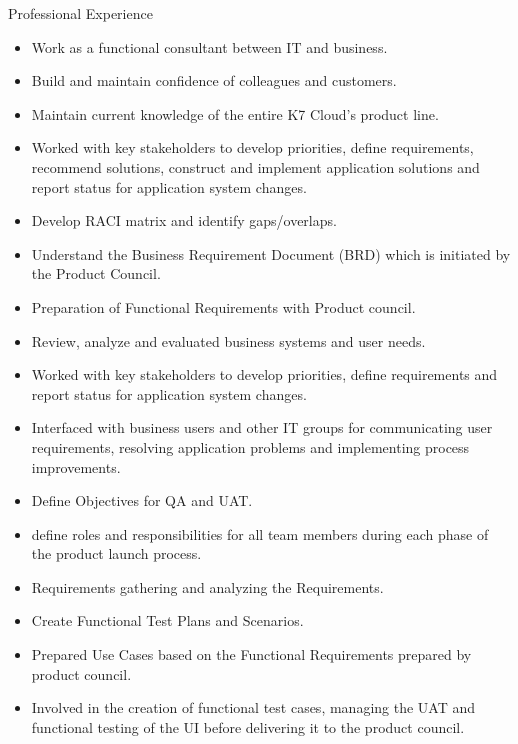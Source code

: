 \documentclass[a4paper,12pt]{article}
\begin{document}

\begin{resumeblock}{Professional Experience}

  \begin{itemize} %
    \item Work as a functional consultant between IT and business.
    \item Build and maintain confidence of colleagues and customers.
    \item Maintain current knowledge of the entire K7 Cloud’s product line.
    \item Worked with key stakeholders to develop priorities, define requirements, recommend solutions, construct and implement application solutions and report status for application system changes.
    \item Develop RACI matrix and identify gaps/overlaps.
    \item Understand the Business Requirement Document (BRD) which is initiated by the Product Council.
    \item Preparation of Functional Requirements with Product council. 
    \item Review, analyze and evaluated business systems and user needs.
    \item Worked with key stakeholders to develop priorities, define requirements and report status for application system changes.
    \item Interfaced with business users and other IT groups  for communicating user requirements, resolving application problems and implementing process improvements.
    \item Define Objectives for QA and UAT. 
    \item define roles and responsibilities for all team members during each phase of the product launch process.

    \item Requirements gathering and analyzing the Requirements.
    \item Create Functional Test Plans and Scenarios.
    \item Prepared Use Cases based on the Functional Requirements prepared by product council. 
    \item Involved in the creation of functional test cases, managing the UAT and functional testing of the UI before delivering it to the product council. 
  \end{itemize}
\shortskip


\end{resumeblock}
\end{document}

